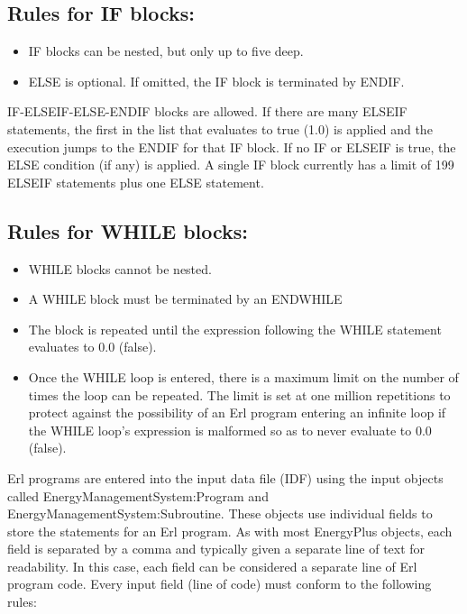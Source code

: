 \subsection{Rules for IF blocks:}\label{rules-for-if-blocks}

\begin{itemize}
\item
  IF blocks can be nested, but only up to five deep.
\item
  ELSE is optional. If omitted, the IF block is terminated by ENDIF.
\end{itemize}

IF-ELSEIF-ELSE-ENDIF blocks are allowed. If there are many ELSEIF statements, the first in the list that evaluates to true (1.0) is applied and the execution jumps to the ENDIF for that IF block. If no IF or ELSEIF is true, the ELSE condition (if any) is applied. A single IF block currently has a limit of 199 ELSEIF statements plus one ELSE statement.

\subsection{Rules for WHILE blocks:}\label{rules-for-while-blocks}

\begin{itemize}
\item
  WHILE blocks cannot be nested.
\item
  A WHILE block must be terminated by an ENDWHILE
\item
  The block is repeated until the expression following the WHILE statement evaluates to 0.0 (false).
\item
  Once the WHILE loop is entered, there is a maximum limit on the number of times the loop can be repeated. The limit is set at one million repetitions to protect against the possibility of an Erl program entering an infinite loop if the WHILE loop's expression is malformed so as to never evaluate to 0.0 (false).
\end{itemize}

Erl programs are entered into the input data file (IDF) using the input objects called EnergyManagementSystem:Program and EnergyManagementSystem:Subroutine. These objects use individual fields to store the statements for an Erl program. As with most EnergyPlus objects, each field is separated by a comma and typically given a separate line of text for readability. In this case, each field can be considered a separate line of Erl program code. Every input field (line of code) must conform to the following rules:

